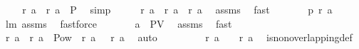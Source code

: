 \begin{isabellebody}
\ \isamarkupfalse%
\ \isamarkupfalse%
\ {\isachardoublequoteopen}{\isacharparenleft}{\isacharquery}r\ a{}\ {\isasymunion}\ {\isacharquery}r\ a{}{\isacharparenright}\ {\isasymin}\ {\isacharquery}P{\isachardoublequoteclose}\ \isamarkupfalse%
\ simp\isanewline
\ \ \isamarkupfalse%
\ \isamarkupfalse%
\ {\isachardoublequoteopen}{\isacharquery}r\ {\isacharquery}a\ {\isacharequal}\ {\isacharparenleft}{\isacharquery}r\ a{}\ {\isasymunion}\ {\isacharquery}r\ a{}{\isacharparenright}{\isachardoublequoteclose}\ \isamarkupfalse%
\ assms\ \isamarkupfalse%
\ fast\isanewline
\ \ \isamarkupfalse%
\ \isamarkupfalse%
\ \isamarkupfalse%
\ {\isachardoublequoteopen}{\isacharquery}p\ {\isacharparenleft}{\isacharquery}r\ {\isacharquery}a{\isacharparenright}{\isachardoublequoteclose}\ \isamarkupfalse%
\ lm{}{}\ assms\ \isamarkupfalse%
\ fastforce\isanewline
\ \ \isamarkupfalse%
\ \isamarkupfalse%
\ \isamarkupfalse%
\ {\isachardoublequoteopen}{\isacharquery}a\ {\isasymin}\ {\isacharquery}PV{\isachardoublequoteclose}\ \isamarkupfalse%
\ assms\ \isamarkupfalse%
\ fast\isanewline
\ \ \isamarkupfalse%
\ \isamarkupfalse%
\ {\isachardoublequoteopen}{\isacharquery}r\ a{}\ {\isasyminter}\ {\isacharparenleft}{\isacharquery}r\ a{}{\isacharparenright}\ {\isasymsubseteq}\ Pow\ {\isacharparenleft}{\isasymUnion}\ {\isacharparenleft}{\isacharquery}r\ a{}{\isacharparenright}\ {\isasyminter}\ {\isacharparenleft}{\isasymUnion}\ {\isacharparenleft}{\isacharquery}r\ a{}{\isacharparenright}{\isacharparenright}{\isacharparenright}{\isachardoublequoteclose}\ \isamarkupfalse%
\ auto\isanewline
\ \ \isamarkupfalse%
\ \isamarkupfalse%
\ \isamarkupfalse%
\ {\isachardoublequoteopen}{\isacharbraceleft}{\isacharbraceright}\ {\isasymnotin}\ {\isacharparenleft}{\isacharquery}r\ a{}{\isacharparenright}\ {\isacharampersand}\ {\isacharbraceleft}{\isacharbraceright}\ {\isasymnotin}\ {\isacharparenleft}{\isacharquery}r\ a{}{\isacharparenright}{\isachardoublequoteclose}\ \isamarkupfalse%
\ is{\isacharunderscore}non{\isacharunderscore}overlapping{\isacharunderscore}def\ \isamarkupfalse%

\end{isabellebody}
